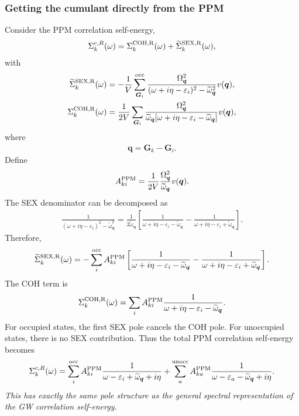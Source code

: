 \subsubsection{Getting the cumulant directly from the PPM}
Consider the PPM correlation self-energy,
\begin{align}
\Sigma_k^{c,R}(\omega)
=
\Sigma_k^{\rm COH,R}(\omega)
+
\widetilde{\Sigma}_k^{\rm SEX,R}(\omega),
\end{align}
with
\begin{align}
\widetilde{\Sigma}_k^{\rm SEX,R}(\omega)
&=
-\frac{1}{V}
\sum_{\bm G_i}^{\rm occ}
\frac{\Omega_{\bm q}^2}
     {(\omega+i\eta-\varepsilon_i)^2-\widetilde{\omega}_{\bm q}^2}
v(\bm q),
\\
\Sigma_k^{\rm COH,R}(\omega)
&=
\frac{1}{2V}
\sum_{\bm G_i}
\frac{\Omega_{\bm q}^2}
     {\widetilde{\omega}_{\bm q}
      [\omega+i\eta-\varepsilon_i-\widetilde{\omega}_{\bm q}]}
v(\bm q),
\end{align}
where
\begin{align}
\bm q=\bm G_k-\bm G_i.
\end{align}
Define
\begin{align}
A_{ki}^{\rm PPM}
=
\frac{1}{2V}
\frac{\Omega_{\bm q}^2}{\widetilde{\omega}_{\bm q}}
v(\bm q).
\end{align}
The SEX denominator can be decomposed as
\begin{align}
\frac{1}
{(\omega+i\eta-\varepsilon_i)^2-\widetilde{\omega}_{\bm q}^2}
=
\frac{1}{2\widetilde{\omega}_{\bm q}}
\left[
\frac{1}{\omega+i\eta-\varepsilon_i-\widetilde{\omega}_{\bm q}}
-
\frac{1}{\omega+i\eta-\varepsilon_i+\widetilde{\omega}_{\bm q}}
\right].
\end{align}
Therefore,
\begin{align}
\widetilde{\Sigma}_k^{\rm SEX,R}(\omega)
=
-\sum_i^{\rm occ} A_{ki}^{\rm PPM}
\left[
\frac{1}{\omega+i\eta-\varepsilon_i-\widetilde{\omega}_{\bm q}}
-
\frac{1}{\omega+i\eta-\varepsilon_i+\widetilde{\omega}_{\bm q}}
\right].
\end{align}
The COH term is
\begin{align}
\Sigma_k^{\rm COH,R}(\omega)
=
\sum_i A_{ki}^{\rm PPM}
\frac{1}{\omega+i\eta-\varepsilon_i-\widetilde{\omega}_{\bm q}}.
\end{align}
For occupied states, the first SEX pole cancels the COH pole. For unoccupied states, there is no SEX contribution. Thus the total PPM correlation self-energy becomes
\begin{align}
\Sigma_k^{c,R}(\omega)
=
\sum_i^{\rm occ}
A_{ki}^{\rm PPM}
\frac{1}{\omega-\varepsilon_i+\widetilde{\omega}_{\bm q}+i\eta}
+
\sum_a^{\rm unocc}
A_{ka}^{\rm PPM}
\frac{1}{\omega-\varepsilon_a-\widetilde{\omega}_{\bm q}+i\eta}.
\end{align}
\emph{This has exactly the same pole structure as the general spectral representation of the GW correlation self-energy.}

